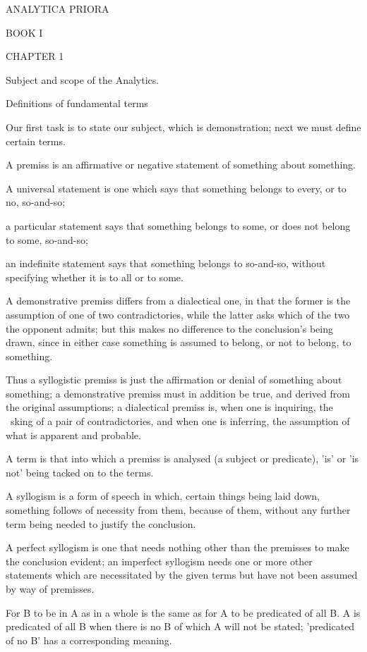 ANALYTICA PRIORA

BOOK I

CHAPTER 1

Subject and scope of the Analytics.

Definitions of fundamental terms

Our first task is to state our subject, which is demonstration;
next we must define certain terms.

A premiss is an affirmative or negative statement of
something about something.

A universal statement is one which says that
something belongs to every, or to no, so-and-so;

a particular statement says that
something belongs to some, or does not belong to some, so-and-so;

an indefinite statement says
that something belongs to so-and-so,
without specifying whether it is to all or to some.

A demonstrative premiss differs from a dialectical one, in
that the former is the assumption of one of two contradictories,
while the latter asks which of the two the opponent admits; but
this makes no difference to the conclusion's being drawn, since in
either case something is assumed to belong, or not to belong, to
something.

Thus a syllogistic premiss is just the affirmation or denial
of something about something; a demonstrative premiss must in
addition be true, and derived from the original assumptions; a
dialectical premiss is, when one is inquiring, the ~sking of a pair
of contradictories, and when one is inferring, the assumption of
what is apparent and probable.

A term is that into which a premiss is analysed (a subject or predicate),
 'is' or 'is not' being tacked on to the terms.

A syllogism is a form of speech in which,
certain things being laid down,
something follows of necessity from them, because of them,
without any further term being needed to justify the conclusion.

A perfect syllogism is one that needs nothing other than the
premisses to make the conclusion evident;
an imperfect syllogism needs one or more other statements
which are necessitated by the given terms
but have not been assumed by way of premisses.

For B to be in A as in a whole is
the same as for A to be predicated of all B.
A is predicated of all B
when there is no B of which A will not be stated;
'predicated of no B' has a corresponding meaning.

